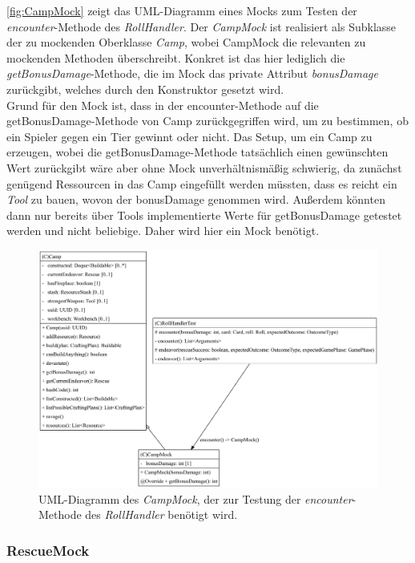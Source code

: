 \autoref{fig:CampMock} zeigt das UML-Diagramm eines Mocks zum Testen der \textit{encounter}-Methode des \textit{RollHandler}. 
Der \textit{CampMock} ist realisiert als Subklasse der zu mockenden Oberklasse \textit{Camp}, wobei CampMock die relevanten 
zu mockenden Methoden überschreibt. Konkret ist das hier lediglich die \textit{getBonusDamage}-Methode, die im Mock das private
Attribut \textit{bonusDamage} zurückgibt, welches durch den Konstruktor gesetzt wird. \\ 
Grund für den Mock ist, dass in der encounter-Methode auf die getBonusDamage-Methode von Camp zurückgegriffen wird, um zu bestimmen,
ob ein Spieler gegen ein Tier gewinnt oder nicht. Das Setup, um ein Camp zu erzeugen, wobei die getBonusDamage-Methode tatsächlich 
einen gewünschten Wert zurückgibt wäre aber ohne Mock unverhältnismäßig schwierig, da zunächst genügend Ressourcen in das Camp 
eingefüllt werden müssten, dass es reicht ein \textit{Tool} zu bauen, wovon der bonusDamage genommen wird. Außerdem könnten dann 
nur bereits über Tools implementierte Werte für getBonusDamage getestet werden und nicht beliebige. Daher wird hier ein Mock benötigt.     

\begin{figure}[H]
	\centering
	\includegraphics[width=1\textwidth]{Bilder/CampMock_structure.pdf} 
	\caption{UML-Diagramm des \textit{CampMock}, der zur Testung der \textit{encounter}-Methode des \textit{RollHandler} benötigt wird.} 
	\label{fig:CampMock}
\end{figure} 

\subsubsection{RescueMock}

